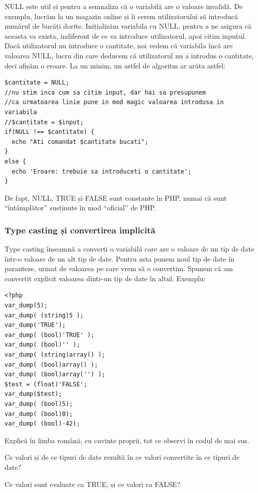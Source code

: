 NULL este util și pentru a semnaliza că o variabilă are o valoare invalidă.
De exemplu, lucrăm la un magazin online și îi cerem utilizatorului să
introducă numărul de bucăți dorite. Inițializăm variabila cu NULL,
pentru a ne asigura că aceasta va exista, indiferent de ce va introduce
utilizatorul, apoi
citim inputul. Dacă utilizatorul nu introduce o cantitate, noi vedem că
variabila încă are valoarea NULL, lucru din care deducem că utilizatorul
nu a introdus o cantitate, deci afișăm o eroare. La un minim, un astfel
de algoritm ar arăta astfel:
\begin{lstlisting}
$cantitate = NULL;
//nu stim inca cum sa citim input, dar hai sa presupunem
//ca urmatoarea linie pune in mod magic valoarea introdusa in variabila
//$cantitate = $input;
if(NULL !== $cantitate) {
  echo "Ati comandat $cantitate bucati";
}
else {
  echo 'Eroare: trebuie sa introduceti o cantitate';
}
\end{lstlisting}

De fapt, NULL, TRUE și FALSE sunt constante în PHP, numai că sunt
``întâmplător'' susținute în mod ``oficial'' de PHP.

\subsubsection{Type casting și convertirea implicită}
Type casting înseamnă a converti o variabilă care are o valoare
de un tip de date într-o valoare de un alt tip de date. Pentru asta
punem noul tip de date în paranteze, urmat de valoarea pe care vrem
să o convertim. Spunem că am convertit explicit valoarea dintr-un tip
de date în altul. Exemplu:
\begin{lstlisting}[label=lst:typecasting,caption=Type casting explicit]
<?php
var_dump(5);
var_dump( (string)5 );
var_dump('TRUE');
var_dump( (bool)'TRUE' );
var_dump( (bool)'' );
var_dump( (string)array() );
var_dump( (bool)array() );
var_dump( (bool)array('') );
$test = (float)'FALSE';
var_dump($test);
var_dump( (bool)5);
var_dump( (bool)0);
var_dump( (bool)-42);
\end{lstlisting}

\begin{Exercise}[title={Observații type casting},difficulty=1]
Explică în limba română, cu cuvinte proprii, tot ce observi în codul de mai sus.

Ce valori și de ce tipuri de date rezultă în ce valori convertite în ce
tipuri de date?

Ce valori sunt evaluate ca TRUE, și ce valori ca FALSE?
\end{Exercise}


